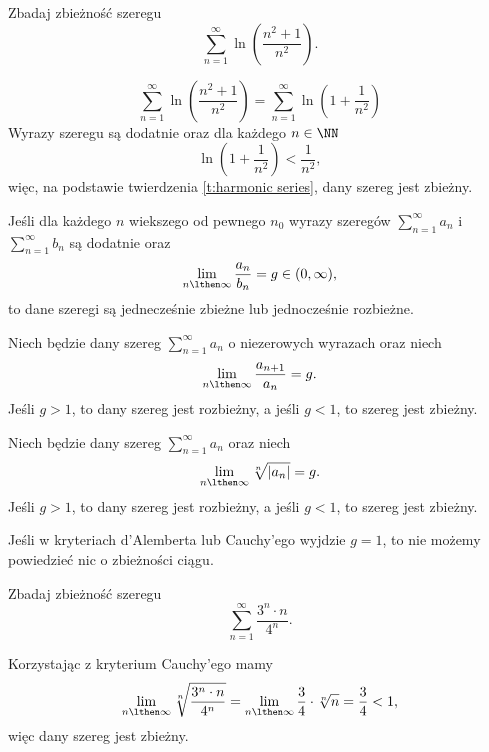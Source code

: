 \begin{example}
    Zbadaj zbieżność szeregu
    \[ \sum_{n=1}^\infty \ln\left(\frac{n^2 + 1}{n^2}\right). \]
\end{example}
\begin{solution}
    \[ \sum_{n=1}^\infty \ln\left(\frac{n^2 + 1}{n^2}\right) = \sum_{n=1}^\infty \ln\left(1 + \frac{1}{n^2}\right) \]
    Wyrazy szeregu są dodatnie oraz dla każdego $n \in \NN$
    \[ \ln\left(1 + \frac{1}{n^2}\right)  < \frac{1}{n^2}, \]
    więc, na podstawie twierdzenia \ref{t:harmonic series}, dany szereg jest zbieżny.
\end{solution}

\begin{theorem}
    Jeśli dla każdego $n$ wiekszego od pewnego $n_0$ wyrazy szeregów $\sum_{n=1}^\infty a_n$ i $\sum_{n=1}^\infty b_n$ są dodatnie oraz
    \[ \lim_{n\lthen\infty} \frac{a_n}{b_n} = g \in (0, \infty), \]
    to dane szeregi są jednecześnie zbieżne lub jednocześnie rozbieżne.
\end{theorem}

\begin{theorem}
    Niech będzie dany szereg $\sum_{n=1}^\infty a_n$ o niezerowych wyrazach oraz niech
    \[ \lim_{n\lthen\infty} \frac{a_{n+1}}{a_n} = g. \]
    Jeśli $g > 1$, to dany szereg jest rozbieżny, a jeśli $g < 1$, to szereg jest zbieżny.
\end{theorem}

\begin{theorem}
    Niech będzie dany szereg $\sum_{n=1}^\infty a_n$ oraz niech
    \[ \lim_{n\lthen\infty} \sqrt[n]{|a_n|} = g. \]
    Jeśli $g > 1$, to dany szereg jest rozbieżny, a jeśli $g < 1$, to szereg jest zbieżny.
\end{theorem}

\begin{remark*}
    Jeśli w kryteriach d'Alemberta lub Cauchy'ego wyjdzie $g = 1$, to nie możemy powiedzieć nic o zbieżności ciągu.
\end{remark*}

\begin{example}
    Zbadaj zbieżność szeregu
    \[ \sum_{n=1}^\infty \frac{3^n \cdot n}{4^n}. \]
\end{example}
\begin{solution}
    Korzystając z kryterium Cauchy'ego mamy
    \[ \lim_{n\lthen\infty} \sqrt[n]{\frac{3^n \cdot n}{4^n}} = \lim_{n\lthen\infty} \frac{3}{4} \cdot \sqrt[n]{n} = \frac{3}{4} < 1, \]
    więc dany szereg jest zbieżny.
\end{solution}

